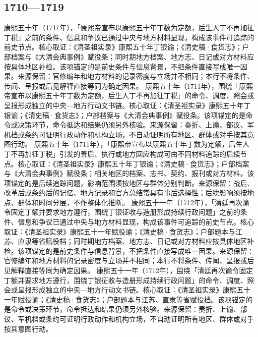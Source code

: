 \subsection{1710—1719}
康熙五十年（1711年），「康熙帝宣布以康熙五十年丁数为定额，后生人丁不再加征丁税」之前的条件、信息和争议已通过中央与地方材料显现，构成该事件可追踪的前史节点。核心取证：《清圣祖实录》康熙五十年丁银谕；《清史稿·食货志》；户部档案与《大清会典事例》赋役条；同时期地方档案、地方志、日记或对方材料应按具体地区补检。该项锚定的是前史条件与信息背景，不把条件直接写成唯一因果。来源保留：官修编年和地方材料的记录密度与立场并不相同；本行不将条件、传闻、呈报或后见解释直接等同为确定因果。
康熙五十年（1711年），围绕「康熙帝宣布以康熙五十年丁数为定额，后生人丁不再加征丁税」的命令、调度、照会或呈报形成独立的中央—地方行动文书链。核心取证：《清圣祖实录》康熙五十年丁银谕；《清史稿·食货志》；户部档案与《大清会典事例》赋役条。该项锚定的是命令或决策环节，命令抵达和结果仍须另外核验。来源保留：奏折、上谕、部议、军机档或条约可证明行政动作和机构立场，不自动证明所有地区、群体或对手按其意图行动。
康熙五十年（1711年），「康熙帝宣布以康熙五十年丁数为定额，后生人丁不再加征丁税」引发的善后、执行或地方回应构成可由不同材料追踪的后续节点。核心取证：《清圣祖实录》康熙五十年丁银谕；《清史稿·食货志》；户部档案与《大清会典事例》赋役条；相关地区的档案、志书、契约、报刊或对方材料。该项锚定的是后续追踪问题，影响范围须按地区与群体分别判断。来源保留：战后、改革后或条约后的记忆、地方记录和官方总结常具有事后选择性；后续影响须按地点、群体和时间分层，不作整体化推断。
康熙五十一年（1712年），「清廷再次谕令固定丁额并要求地方遵行，围绕丁银征收与造册形成持续行政问题」之前的条件、信息和争议已通过中央与地方材料显现，构成该事件可追踪的前史节点。核心取证：《清圣祖实录》康熙五十一年赋役谕；《清史稿·食货志》；户部题本与江苏、直隶等省赋役档；同时期地方档案、地方志、日记或对方材料应按具体地区补检。该项锚定的是前史条件与信息背景，不把条件直接写成唯一因果。来源保留：官修编年和地方材料的记录密度与立场并不相同；本行不将条件、传闻、呈报或后见解释直接等同为确定因果。
康熙五十一年（1712年），围绕「清廷再次谕令固定丁额并要求地方遵行，围绕丁银征收与造册形成持续行政问题」的命令、调度、照会或呈报形成独立的中央—地方行动文书链。核心取证：《清圣祖实录》康熙五十一年赋役谕；《清史稿·食货志》；户部题本与江苏、直隶等省赋役档。该项锚定的是命令或决策环节，命令抵达和结果仍须另外核验。来源保留：奏折、上谕、部议、军机档或条约可证明行政动作和机构立场，不自动证明所有地区、群体或对手按其意图行动。
